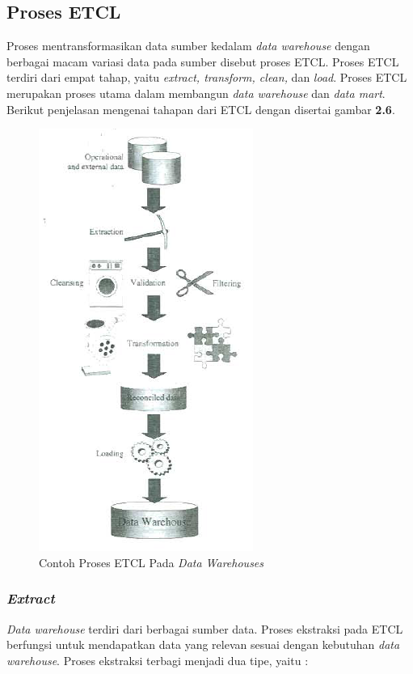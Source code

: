\subsection{Proses ETCL}
Proses mentransformasikan data sumber kedalam \textit{data warehouse} dengan berbagai macam variasi data pada sumber disebut proses ETCL. Proses ETCL terdiri dari empat tahap, yaitu \textit{extract, transform, clean,} dan \textit{load}. Proses ETCL merupakan proses utama dalam membangun \textit{data warehouse} dan \textit{data mart}. Berikut penjelasan mengenai tahapan dari ETCL dengan disertai gambar \textbf{2.6}.
\begin{figure}[h]
	\centering
	\includegraphics[scale=0.95]{Gambar/etl-proses}
	\caption{Contoh Proses ETCL Pada \textit{Data Warehouses}\cite{Matteo:2009}}
	\end{figure} 

\subsubsection{\textit{Extract}}
\textit{Data warehouse} terdiri dari berbagai sumber data. Proses ekstraksi pada ETCL berfungsi untuk mendapatkan data yang relevan sesuai dengan kebutuhan \textit{data warehouse}. Proses ekstraksi terbagi menjadi dua tipe, yaitu \cite{Matteo:2009}:

